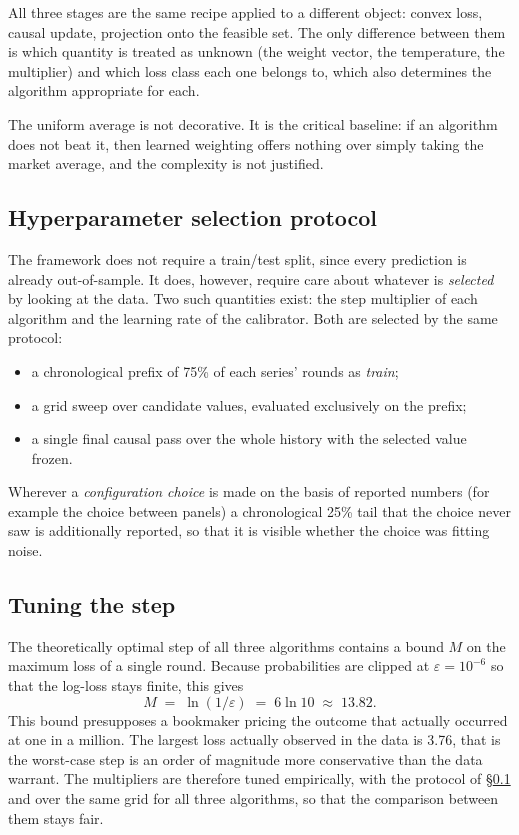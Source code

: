 \documentclass[12pt,a4paper,oneside]{report}
\renewcommand{\_}{\oldunderscore\allowbreak}
\theoremstyle{definition}
\theoremstyle{plain}
\theoremstyle{remark}
\begin{document}
All three stages are the same recipe applied to a different object: convex loss, causal update,
projection onto the feasible set. The only difference between them is which quantity is treated
as unknown (the weight vector, the temperature, the multiplier) and which loss class each one
belongs to, which also determines the algorithm appropriate for each.

The uniform average is not decorative. It is the critical baseline: if an algorithm does not beat
it, then learned weighting offers nothing over simply taking the market average, and the
complexity is not justified.

\subsection{Hyperparameter selection protocol}
\label{sec:protocol}

The framework does not require a train/test split, since every prediction is already
out-of-sample. It does, however, require care about whatever is \emph{selected} by looking at the
data. Two such quantities exist: the step multiplier of each algorithm and the learning rate of
the calibrator. Both are selected by the same protocol:

\begin{itemize}
  \item a chronological prefix of 75\% of each series' rounds as \emph{train};
  \item a grid sweep over candidate values, evaluated exclusively on the prefix;
  \item a single final causal pass over the whole history with the selected value frozen.
\end{itemize}

Wherever a \emph{configuration choice} is made on the basis of reported numbers (for example
the choice between panels) a chronological 25\% tail that the choice never saw is additionally
reported, so that it is visible whether the choice was fitting noise.

\subsection{Tuning the step}

The theoretically optimal step of all three algorithms contains a bound $M$ on the maximum loss
of a single round. Because probabilities are clipped at $\varepsilon = 10^{-6}$ so that the
log-loss stays finite, this gives
\[
M \;=\; \ln(1/\varepsilon) \;=\; 6\ln 10 \;\approx\; 13.82 .
\]
This bound presupposes a bookmaker pricing the outcome that actually occurred at one in a
million. The largest loss actually observed in the data is 3.76, that is the worst-case step is
an order of magnitude more conservative than the data warrant. The multipliers are therefore
tuned empirically, with the protocol of \S\ref{sec:protocol} and over the same grid for all three
algorithms, so that the comparison between them stays fair.
\end{document}
